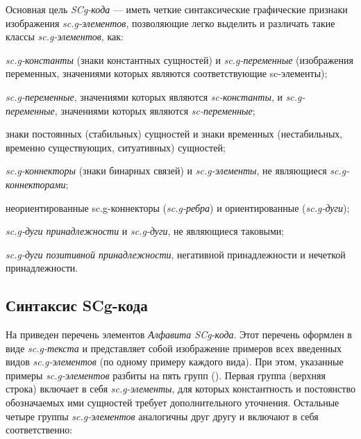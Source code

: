 Основная цель \textit{SCg-кода} --- иметь четкие синтаксические графические признаки изображения \textit{sc.g-элементов}, позволяющие легко выделить и различать такие классы \textit{sc.g-элементов}, как:
\begin{textitemize}
	\item \textit{sc.g-константы} (знаки константных сущностей) и \textit{sc.g-переменные} (изображения переменных, значениями которых являются соответствующие sc-элементы);
	\item \textit{sc.g-переменные}, значениями которых являются \textit{sc-константы}, и \textit{sc.g-переменные}, значениями которых являются \textit{sc-переменные};
	\item знаки постоянных (стабильных) сущностей и знаки временных (нестабильных, временно существующих, ситуативных) сущностей;
	\item \textit{sc.g-коннекторы} (знаки бинарных связей) и \textit{sc.g-элементы}, не являющиеся \textit{sc.g-коннекторами};
	\item неориентированные sc.g-коннекторы (\textit{sc.g-ребра}) и ориентированные (\textit{sc.g-дуги});
	\item \textit{sc.g-дуги принадлежности} и \textit{sc.g-дуги}, не являющиеся таковыми;
	\item \textit{sc.g-дуги позитивной принадлежности}, негативной принадлежности и нечеткой принадлежности.
\end{textitemize}

\subsection{Синтаксис SCg-кода}
\label{sec_scg_syntax}

\begin{SCn}
\end{SCn}

На \textit{} приведен перечень элементов \textit{Алфавита SCg-кода\scnsupergroupsign}.
Этот перечень оформлен в виде \textit{sc.g-текста} и представляет собой изображение примеров всех введенных видов \textit{sc.g-элементов} (по одному примеру каждого вида). При этом, указанные примеры \textit{sc.g-элементов} разбиты на пять групп (\textit{}). Первая группа (верхняя строка) включает в себя \textit{sc.g-элементы}, для которых константность и постоянство обозначаемых ими сущностей требует дополнительного уточнения. Остальные четыре группы \textit{sc.g-элементов} аналогичны друг другу и включают в себя соответственно:

